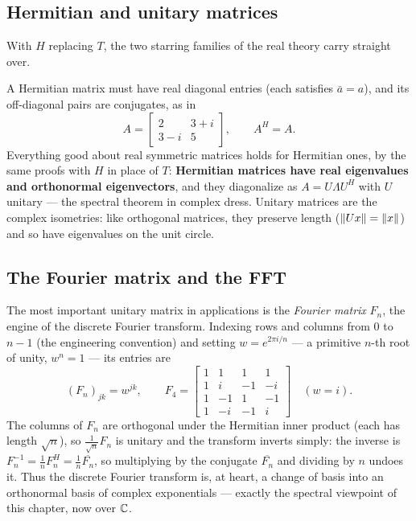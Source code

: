 \subsection{Hermitian and unitary matrices}

With $H$ replacing $T$, the two starring families of the real theory carry straight over.


A Hermitian matrix must have real diagonal entries (each satisfies $\bar a=a$), and its off-diagonal pairs are conjugates, as in
\[
   A=\begin{bmatrix} 2 & 3+i\\ 3-i & 5\end{bmatrix},
   \qquad A^H=A .
\]
Everything good about real symmetric matrices holds for Hermitian ones, by the same proofs with $H$ in place of $T$: \textbf{Hermitian matrices have real eigenvalues and orthonormal eigenvectors}, and they diagonalize as $A=U\Lambda U^H$ with $U$ unitary --- the spectral theorem in complex dress. Unitary matrices are the complex isometries: like orthogonal matrices, they preserve length ($\left\|Ux\right\|=\left\|x\right\|$) and so have eigenvalues on the unit circle.

\subsection{The Fourier matrix and the FFT}

The most important unitary matrix in applications is the \emph{Fourier matrix} $F_n$, the engine of the discrete Fourier transform. Indexing rows and columns from $0$ to $n-1$ (the engineering convention) and setting $w=e^{2\pi i/n}$ --- a primitive $n$-th root of unity, $w^n=1$ --- its entries are
\[
   (F_n)_{jk}=w^{jk},
   \qquad
   F_4=\begin{bmatrix}
     1 & 1 & 1 & 1\\
     1 & i & -1 & -i\\
     1 & -1 & 1 & -1\\
     1 & -i & -1 & i
   \end{bmatrix}
   \quad(w=i).
\]
The columns of $F_n$ are orthogonal under the Hermitian inner product (each has length $\sqrt n$), so $\tfrac{1}{\sqrt n}F_n$ is unitary and the transform inverts simply: the inverse is $F_n^{-1}=\tfrac1n F_n^{H}=\tfrac1n\overline{F_n}$, so multiplying by the conjugate $\overline{F_n}$ and dividing by $n$ undoes it. Thus the discrete Fourier transform is, at heart, a change of basis into an orthonormal basis of complex exponentials --- exactly the spectral viewpoint of this chapter, now over $\mathbb{C}$.

